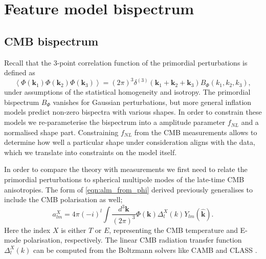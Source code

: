 \section{Feature model bispectrum} \label{section: feature model bispectrum}
\subsection{CMB bispectrum}

Recall that the 3-point correlation function of the primordial perturbations is defined as
\begin{equation}
	\left< \Phi(\mathbf{k}_1) \Phi(\mathbf{k}_2) \Phi(\mathbf{k}_3) \right> = (2\pi)^3 \delta^{(3)}(\mathbf{k}_1 + \mathbf{k}_2 + \mathbf{k}_3) B_\Phi (k_1, k_2, k_3),
\end{equation}
under assumptions of the statistical homogeneity and isotropy. The primordial bispectrum $B_\Phi$ vanishes for Gaussian perturbations, but more general inflation models predict non-zero bispectra with various shapes.  In order to constrain these models we re-parameterise the bispectrum into a amplitude parameter $f_{NL}$ and a normalised shape part. Constraining $f_{NL}$ from the CMB measurements allows to determine how well a particular shape under consideration aligns with the data, which we translate into constraints on the model itself.

In order to compare the theory with measurements we first need to relate the primordial perturbations to spherical multipole modes of the late-time CMB anisotropies. The form of \eqref{eqn:alm_from_phi} derived previously generalises to include the CMB polarisation as well;
\begin{equation}
	a_{lm}^{X} = 4\pi(-i)^l \int \frac{d^3\mathbf{k}}{(2\pi)^3}  \Phi(\mathbf{k}) \Delta_l^X(k) Y_{lm}(\hat{\mathbf{k}}).
	\label{theoretical multiple moments}
\end{equation}
Here the index $X$ is either $T$ or $E$, representing the CMB temperature and E-mode polarisation, respectively. The linear CMB radiation transfer function $\Delta_l^X(k)$ can be computed from the Boltzmann solvers like CAMB \cite{Lewis2000} and CLASS \cite{Blas2011class}.

